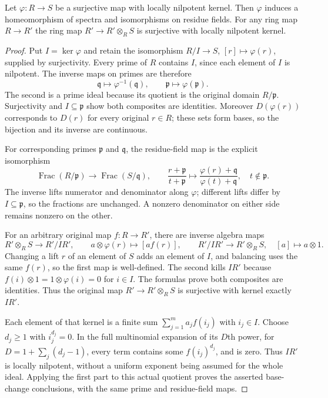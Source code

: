 \begin{lemma}
\label{editorial-source-lemma-surjective-locally-nilpotent-kernel}
Let $\varphi : R \to S$ be a surjective map with locally nilpotent kernel.
Then $\varphi$ induces a homeomorphism of spectra and isomorphisms
on residue fields. For any ring map $R \to R'$ the ring map
$R' \to R' \otimes_R S$ is surjective with locally nilpotent kernel.
\end{lemma}

\begin{proof}
Put $I=\ker\varphi$ and retain the isomorphism
$R/I\to S$, $[r]\mapsto\varphi(r)$, supplied
by surjectivity. Every prime of $R$ contains
$I$, since each element of $I$ is nilpotent.
The inverse maps on primes are therefore
$$
\mathfrak q\longmapsto\varphi^{-1}(\mathfrak q),
\qquad \mathfrak p\longmapsto\varphi(\mathfrak p).
$$
The second is a prime ideal because its
quotient is the original domain $R/\mathfrak p$.
Surjectivity and $I\subseteq\mathfrak p$
show both composites are identities.
Moreover $D(\varphi(r))$ corresponds to
$D(r)$ for every original $r\in R$;
these sets form bases, so the bijection
and its inverse are continuous.

For corresponding primes $\mathfrak p$
and $\mathfrak q$, the residue-field map is
the explicit isomorphism
$$
\operatorname{Frac}(R/\mathfrak p)
\longrightarrow\operatorname{Frac}(S/\mathfrak q),
\qquad
\frac{r+\mathfrak p}{t+\mathfrak p}
\longmapsto
\frac{\varphi(r)+\mathfrak q}{\varphi(t)+\mathfrak q},
\quad t\notin\mathfrak p.
$$
The inverse lifts numerator and denominator
along $\varphi$; different lifts differ by
$I\subseteq\mathfrak p$, so the fractions
are unchanged. A nonzero denominator on
either side remains nonzero on the other.

For an arbitrary original map $f:R\to R'$,
there are inverse algebra maps
$$
R'\otimes_R S\longrightarrow R'/IR',\qquad
a\otimes\varphi(r)\longmapsto[af(r)],
\qquad
R'/IR'\longrightarrow R'\otimes_R S,\quad
[a]\longmapsto a\otimes1.
$$
Changing a lift $r$ of an element of $S$
adds an element of $I$, and balancing
uses the same $f(r)$, so the first map
is well-defined. The second kills $IR'$
because $f(i)\otimes1=1\otimes\varphi(i)=0$
for $i\in I$. The formulas prove both
composites are identities. Thus the
original map $R'\to R'\otimes_R S$ is
surjective with kernel exactly $IR'$.

Each element of that kernel is a finite
sum $\sum_{j=1}^m a_j f(i_j)$ with $i_j\in I$.
Choose $d_j\geq1$ with $i_j^{d_j}=0$.
In the full multinomial expansion of its
$D$th power, for $D=1+\sum_j(d_j-1)$,
every term contains some $f(i_j)^{d_j}$,
and is zero. Thus $IR'$ is locally
nilpotent, without a uniform exponent
being assumed for the whole ideal.
Applying the first part to this actual
quotient proves the asserted base-change
conclusions, with the same prime and
residue-field maps.


\end{proof}
